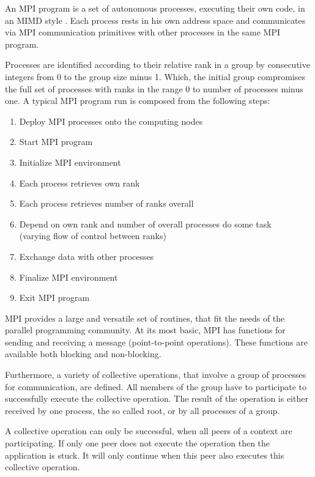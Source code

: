 An MPI program is a set of autonomous processes, executing their own
code, in an MIMD style \cite{Flynn:1972:COE:1952456.1952459}. Each
process rests in his own address space and communicates via MPI
communication primitives with other processes in the same MPI
program.

Processes are identified according to their relative rank in a group
by consecutive integers from 0 to the group size minus 1. Which, the
initial group compromises the full set of processes with ranks in the
range 0 to number of processes minus one. A typical MPI program run is
composed from the following steps:

\begin{enumerate}
\item Deploy MPI processes onto the computing nodes
\item Start MPI program
\item Initialize MPI environment
\item Each process retrieves own rank
\item Each process retrieves number of ranks overall
\item Depend on own rank and number of overall processes do some task\\
  (varying flow of control between ranks)
\item Exchange data with other processes
\item Finalize MPI environment
\item Exit MPI program
\end{enumerate}

MPI provides a large and versatile set of routines, that fit the needs
of the parallel programming community. At its most basic, MPI has
functions for sending and receiving a message (point-to-point
operations).  These functions are available both blocking and
non-blocking.

Furthermore, a variety of collective operations, that involve a group
of processes for communication, are defined. All members of the group
have to participate to successfully execute the collective operation.
The result of the operation is either received by one process, the so
called root, or by all processes of a group.

A collective operation can only be successful, when all peers of a
context are participating. If only one peer does not execute the
operation then the application is stuck. It will only continue when
this peer also executes this collective operation.


